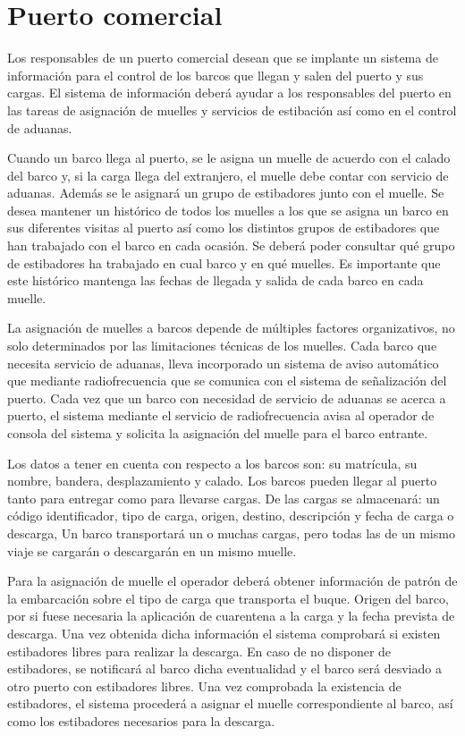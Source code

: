 \documentclass[a4paper]{article}
\begin{document}
\section{Puerto comercial}
Los responsables de un puerto comercial desean que se implante un sistema de información para el control de los barcos que llegan y salen del puerto y sus cargas. El sistema de información deberá ayudar a los responsables del puerto en las tareas de asignación de muelles y servicios de estibación así como en el control de aduanas.

Cuando un barco llega al puerto, se le asigna un muelle de acuerdo con el calado del barco y, si la carga llega del extranjero, el muelle debe contar con servicio de aduanas. Además se le asignará un grupo de estibadores junto con el muelle. Se desea mantener un histórico de todos los muelles a los que se asigna un barco en sus diferentes visitas al puerto así como los distintos grupos de estibadores que han trabajado con el barco en cada ocasión. Se deberá poder consultar qué grupo de estibadores ha trabajado en cual barco y en qué muelles. Es importante que este histórico mantenga las fechas de llegada y salida de cada barco en cada muelle.

La asignación de muelles a barcos depende de múltiples factores organizativos, no solo determinados por las limitaciones técnicas de los muelles. Cada barco que necesita servicio de aduanas, lleva incorporado un sistema de aviso automático que mediante radiofrecuencia que se comunica con el sistema de señalización del puerto. Cada vez que un barco con necesidad de servicio de aduanas se acerca a puerto, el sistema mediante el servicio de radiofrecuencia avisa al operador de consola del sistema y solicita la asignación del muelle para el barco entrante.

Los datos a tener en cuenta con respecto a los barcos son: su matrícula, su nombre, bandera, desplazamiento y calado. Los barcos pueden llegar al puerto tanto para entregar como para llevarse cargas. De las cargas se almacenará: un código identificador, tipo de carga, origen, destino, descripción y fecha de carga o descarga, Un barco transportará un o muchas cargas, pero todas las de un mismo viaje se cargarán o descargarán en un mismo muelle.

Para la asignación de muelle el operador deberá obtener información de patrón de la embarcación sobre el tipo de carga que transporta el buque. Origen del barco, por si fuese necesaria la aplicación de cuarentena a la carga y la fecha prevista de descarga. Una vez obtenida dicha información el sistema comprobará si existen estibadores libres para realizar la descarga. En caso de no disponer de estibadores, se notificará al barco dicha eventualidad y el barco será desviado a otro puerto con estibadores libres. Una vez comprobada la existencia de estibadores, el sistema procederá a asignar el muelle correspondiente al barco, así como los estibadores necesarios para la descarga.
\end{document}
